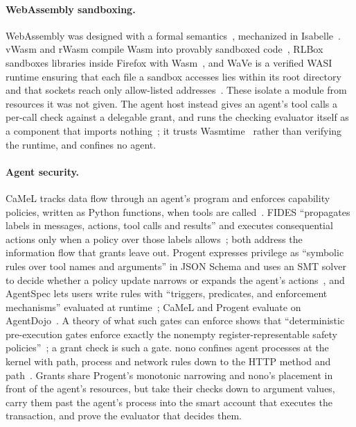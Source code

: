 \paragraph{WebAssembly sandboxing.} WebAssembly was designed with a formal
semantics~\cite{wasm}, mechanized in Isabelle~\cite{wasmcert}. vWasm and rWasm
compile Wasm into provably sandboxed code~\cite{bosamiya}, RLBox sandboxes
libraries inside Firefox with Wasm~\cite{rlbox}, and WaVe is a verified WASI
runtime ensuring that each file a sandbox accesses lies within its root
directory and that sockets reach only allow-listed addresses~\cite{wave}.
These isolate a module from resources it was not given. The agent host instead
gives an agent's tool calls a per-call check against a delegable grant, and
runs the checking evaluator itself as a component that imports
nothing~\cite{componentModelDocs}; it trusts Wasmtime~\cite{wasmtime} rather
than verifying the runtime, and confines no agent.

\paragraph{Agent security.} CaMeL tracks data flow through an agent's program
and enforces capability policies, written as Python functions, when tools are
called~\cite{camel}. FIDES ``propagates labels in messages, actions, tool calls
and results'' and executes consequential actions only when a policy over those
labels allows~\cite{fides}; both address the information flow that grants
leave out. Progent expresses privilege as ``symbolic rules over tool names and
arguments'' in JSON Schema and uses an SMT solver to decide whether a policy
update narrows or expands the agent's actions~\cite{progent}, and AgentSpec
lets users write rules with ``triggers, predicates, and enforcement
mechanisms'' evaluated at runtime~\cite{agentspec}; CaMeL and Progent evaluate
on AgentDojo~\cite{agentdojo}. A theory of what such gates can enforce shows
that ``deterministic pre-execution gates enforce exactly the nonempty
register-representable safety policies''~\cite{whatCanBeEnforced}; a grant
check is such a gate. nono
confines agent processes at the kernel with path, process and network rules
down to the HTTP method and path~\cite{nono}. Grants share Progent's monotonic
narrowing and nono's placement in front of the agent's resources, but take
their checks down to argument values, carry them past the agent's process into
the smart account that executes the transaction, and prove the evaluator that
decides them.

